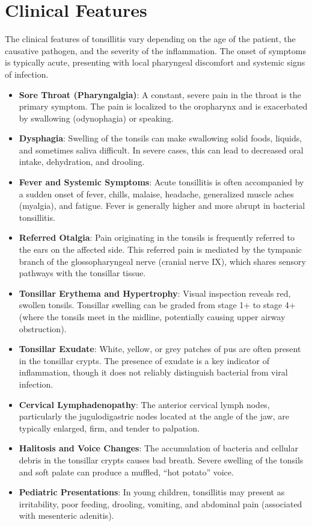 \section*{Clinical Features}
The clinical features of tonsillitis vary depending on the age of the patient, the causative pathogen, and the severity of the inflammation. The onset of symptoms is typically acute, presenting with local pharyngeal discomfort and systemic signs of infection.
\begin{itemize}
    \item \textbf{Sore Throat (Pharyngalgia)}: A constant, severe pain in the throat is the primary symptom. The pain is localized to the oropharynx and is exacerbated by swallowing (odynophagia) or speaking.
    \item \textbf{Dysphagia}: Swelling of the tonsils can make swallowing solid foods, liquids, and sometimes saliva difficult. In severe cases, this can lead to decreased oral intake, dehydration, and drooling.
    \item \textbf{Fever and Systemic Symptoms}: Acute tonsillitis is often accompanied by a sudden onset of fever, chills, malaise, headache, generalized muscle aches (myalgia), and fatigue. Fever is generally higher and more abrupt in bacterial tonsillitis.
    \item \textbf{Referred Otalgia}: Pain originating in the tonsils is frequently referred to the ears on the affected side. This referred pain is mediated by the tympanic branch of the glossopharyngeal nerve (cranial nerve IX), which shares sensory pathways with the tonsillar tissue.
    \item \textbf{Tonsillar Erythema and Hypertrophy}: Visual inspection reveals red, swollen tonsils. Tonsillar swelling can be graded from stage 1+ to stage 4+ (where the tonsils meet in the midline, potentially causing upper airway obstruction).
    \item \textbf{Tonsillar Exudate}: White, yellow, or grey patches of pus are often present in the tonsillar crypts. The presence of exudate is a key indicator of inflammation, though it does not reliably distinguish bacterial from viral infection.
    \item \textbf{Cervical Lymphadenopathy}: The anterior cervical lymph nodes, particularly the jugulodigastric nodes located at the angle of the jaw, are typically enlarged, firm, and tender to palpation.
    \item \textbf{Halitosis and Voice Changes}: The accumulation of bacteria and cellular debris in the tonsillar crypts causes bad breath. Severe swelling of the tonsils and soft palate can produce a muffled, ``hot potato'' voice.
    \item \textbf{Pediatric Presentations}: In young children, tonsillitis may present as irritability, poor feeding, drooling, vomiting, and abdominal pain (associated with mesenteric adenitis).
\end{itemize}


